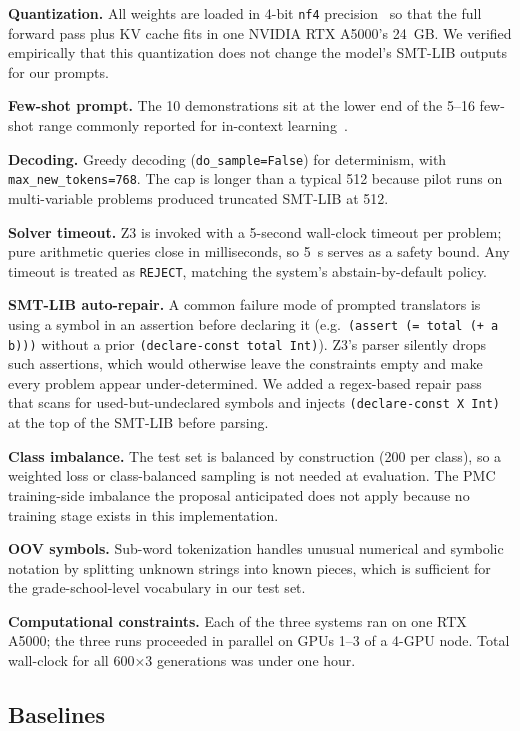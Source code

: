 \documentclass[sigconf, nonacm, onecolumn]{acmart}
\begin{document}
\textbf{Quantization.} All weights are loaded in 4-bit \texttt{nf4}
precision~\cite{dettmers2022} so that the full forward pass plus KV cache
fits in one NVIDIA RTX A5000's 24~GB. We verified empirically that this
quantization does not change the model's SMT-LIB outputs for our prompts.

\textbf{Few-shot prompt.} The 10 demonstrations sit at the lower end of
the 5--16 few-shot range commonly reported for in-context
learning~\cite{brown2020}.

\textbf{Decoding.} Greedy decoding (\texttt{do\_sample=False}) for
determinism, with \texttt{max\_new\_tokens=768}. The cap is longer than a
typical 512 because pilot runs on multi-variable problems produced
truncated SMT-LIB at 512.

\textbf{Solver timeout.} Z3 is invoked with a 5-second wall-clock timeout
per problem; pure arithmetic queries close in milliseconds, so 5~s serves
as a safety bound. Any timeout is treated as \texttt{REJECT}, matching the
system's abstain-by-default policy.

\textbf{SMT-LIB auto-repair.} A common failure mode of prompted
translators is using a symbol in an assertion before declaring it (e.g.\
\texttt{(assert (= total (+ a b)))} without a prior
\texttt{(declare-const total Int)}). Z3's parser silently drops such
assertions, which would otherwise leave the constraints empty and make
every problem appear under-determined. We added a regex-based repair
pass that scans for used-but-undeclared symbols and injects
\texttt{(declare-const X Int)} at the top of the SMT-LIB before parsing.

\textbf{Class imbalance.} The test set is balanced by construction (200
per class), so a weighted loss or class-balanced sampling is not needed
at evaluation. The PMC training-side imbalance the proposal anticipated
does not apply because no training stage exists in this implementation.

\textbf{OOV symbols.} Sub-word tokenization handles unusual numerical and
symbolic notation by splitting unknown strings into known pieces, which
is sufficient for the grade-school-level vocabulary in our test set.

\textbf{Computational constraints.} Each of the three systems ran on one
RTX A5000; the three runs proceeded in parallel on GPUs 1--3 of a
4-GPU node. Total wall-clock for all 600$\times$3 generations was under
one hour.

\subsection{Baselines}
\end{document}
